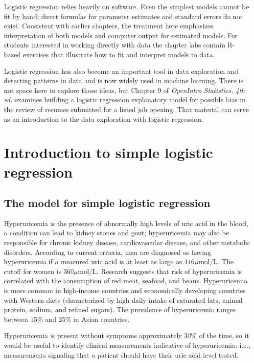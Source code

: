 Logistic regression relies heavily on software.  Even the simplest models cannot be fit by hand; direct formulas for parameter estimates and standard errors do not exist.  Consistent with earlier chapters, the treatment here emphasizes interpretation of both models and computer output for estimated models.  For students interested in working directly with data the chapter labs contain \textsf{R}-based exercises that illustrate how to fit and interpret models to data.

Logistic regression has also become an important tool in data exploration and detecting patterns in data and is now widely used in machine learning.  There is not space here to explore those ideas, but Chapter 9 of \textit{OpenIntro Statistics, 4th ed.} examines building a logistic regression explanatory model for possible bias in the review of resumes submitted for a listed job opening.  That material can serve as an introduction to the data exploration with logistic regression.

\section{Introduction to simple logistic regression}
\label{introSimpleLogisticRegression}

\subsection{The model for simple logistic regression}

Hyperuricemia is the presence of abnormally high levels of uric acid in the blood, a  condition can lead to kidney stones and gout; hyperuricemia may also be responsible for chronic kidney disease, cardiovascular disease, and other metabolic disorders. According to current criteria, men are diagnosed as having hyperuricemia if a measured uric acid is at least as large as $416\mu\text{mol/L}$.  The cutoff for women is $360\mu\text{mol/L}$. Research suggests that risk of hyperuricemia is correlated with the consumption of red meat, seafood, and beans. Hyperuricemia is more common in high-income countries and economically developing countries with Western diets (characterized by high daily intake of saturated fats, animal protein, sodium, and refined sugars). The prevalence of hyperuricemia ranges between 15\% and 25\% in Asian countries. 

Hyperuricemia is present without symptoms approximately 30\% of the time, so it would be useful to identify clinical measurements indicative of hyperuricemia; i.e., measurements signaling that a patient should have their uric acid level tested.


